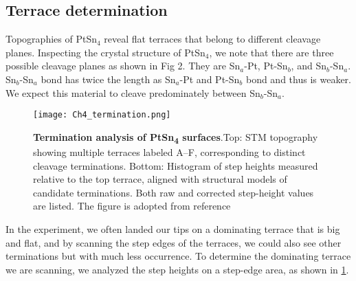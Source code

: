 \subsection{Terrace determination}
\par Topographies of PtSn$_4$ reveal flat terraces that belong to different cleavage planes. Inspecting the crystal structure of PtSn$_4$, we note that there are three possible cleavage planes as shown in Fig 2. They are Sn$_a$-Pt, Pt-Sn$_b$, and Sn$_b$-Sn$_a$. Sn$_b$-Sn$_a$ bond has twice the length as Sn$_a$-Pt and Pt-Sn$_b$ bond and thus is weaker. We expect this material to cleave predominately between Sn$_b$-Sn$_a$. 

\begin{figure}
	\centering
	\texttt{[image: Ch4\_termination.png]}
	\caption[\textbf{Termination analysis of PtSn\textsubscript{4} surfaces}]{\textbf{Termination analysis of PtSn\textsubscript{4} surfaces}.Top: STM topography showing multiple terraces labeled A–F, corresponding to distinct cleavage terminations.
	Bottom: Histogram of step heights measured relative to the top terrace, aligned with structural models of candidate terminations. Both raw and corrected step-height values are listed. The figure is adopted from reference \cite{warnerDefectTerraceCharacterization2022}}
	\label{fig:ch4_termination}
\end{figure}

\par In the experiment, we often landed our tips on a dominating terrace that is big and flat, and by scanning the step edges of the terraces, we could also see other terminations but with much less occurrence. To determine the dominating terrace we are scanning, we analyzed the step heights on a step-edge area, as shown in \ref{fig:ch4_termination}. 


